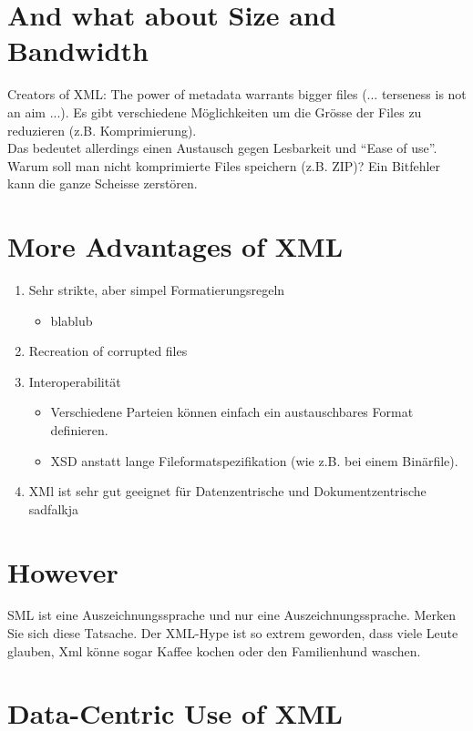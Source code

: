 \section{And what about Size and Bandwidth}
Creators of XML: The power of metadata warrants bigger files (... terseness is not an aim ...).
Es gibt verschiedene Möglichkeiten um die Grösse der Files zu reduzieren (z.B. Komprimierung).\\
Das bedeutet allerdings einen Austausch gegen Lesbarkeit und "`Ease of use"'.\\
Warum soll man nicht komprimierte Files speichern (z.B. ZIP)? Ein Bitfehler kann die ganze Scheisse zerstören.

\section{More Advantages of XML}
\begin{enumerate}
\item Sehr strikte, aber simpel Formatierungsregeln
\begin{itemize}
\item blablub
\end{itemize}
\item Recreation of corrupted files

\item Interoperabilität
\begin{itemize}
\item Verschiedene Parteien können einfach ein austauschbares Format definieren.
\item XSD anstatt lange Fileformatspezifikation (wie z.B. bei einem Binärfile).
\end{itemize}
\item XMl ist sehr gut geeignet für Datenzentrische und Dokumentzentrische sadfalkja
\end{enumerate}

\section{However}
SML ist eine Auszeichnungssprache und nur eine Auszeichnungssprache. Merken Sie sich diese Tatsache.
Der XML-Hype ist so extrem geworden, dass viele Leute glauben, Xml könne sogar Kaffee kochen oder den Familienhund waschen.

\section{Data-Centric Use of XML}

